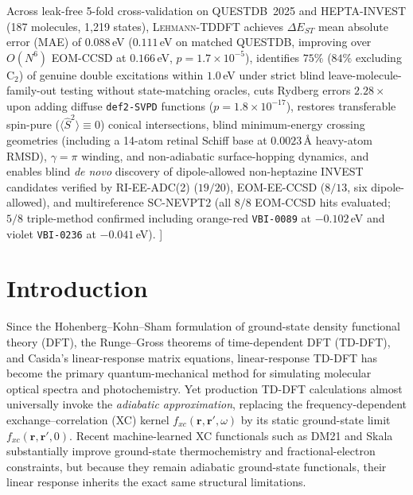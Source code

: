 \documentclass[10pt,twocolumn]{article}
\theoremstyle{natthm}
\newcommand{\leh}{\textsc{Lehmann-TDDFT}}
\newcommand{\dEST}{\Delta E_{ST}}
\newcommand{\Ssq}{\langle\hat{S}^2\rangle}
\begin{document}
{{{{      Across leak-free 5-fold cross-validation on QUESTDB~2025 and HEPTA-INVEST (187 molecules, 1,219 states), \leh{} achieves $\dEST$ mean absolute error (MAE) of $0.088$\,eV ($0.111$\,eV on matched QUESTDB, improving over $O(N^6)$ EOM-CCSD at $0.166$\,eV, $p=1.7\times 10^{-5}$), identifies $75\%$ ($84\%$ excluding $\mathrm{C}_2$) of genuine double excitations within $1.0$\,eV under strict blind leave-molecule-family-out testing without state-matching oracles, cuts Rydberg errors $2.28\times$ upon adding diffuse \texttt{def2-SVPD} functions ($p=1.8\times 10^{-17}$), restores transferable spin-pure ($\Ssq\equiv 0$) conical intersections, blind minimum-energy crossing geometries (including a 14-atom retinal Schiff base at $0.0023$\,\AA{} heavy-atom RMSD), $\gamma=\pi$ winding, and non-adiabatic surface-hopping dynamics, and enables blind \emph{de novo} discovery of dipole-allowed non-heptazine INVEST candidates verified by RI-EE-ADC(2) ($19/20$), EOM-EE-CCSD ($8/13$, six dipole-allowed), and multireference SC-NEVPT2 (all $8/8$ EOM-CCSD hits evaluated; $5/8$ triple-method confirmed including orange-red \texttt{VBI-0089} at $-0.102$\,eV and violet \texttt{VBI-0236} at $-0.041$\,eV).%
      }\vspace{3pt}%
    }%
  }
  \vspace{11pt}
}]

\section*{Introduction}
Since the Hohenberg--Kohn--Sham formulation of ground-state density functional theory (DFT)\cite{hohenberg1964,kohn1965}, the Runge--Gross theorems of time-dependent DFT (TD-DFT)\cite{runge1984}, and Casida's linear-response matrix equations\cite{casida1995,petersilka1996,hirata1999,furche2002}, linear-response TD-DFT has become the primary quantum-mechanical method for simulating molecular optical spectra and photochemistry\cite{dreuw2005,ullrich2012,casida2012,laurent2013,maitra2016}.
Yet production TD-DFT calculations almost universally invoke the \emph{adiabatic approximation}, replacing the frequency-dependent exchange--correlation (XC) kernel $f_{xc}(\mathbf{r},\mathbf{r}',\omega)$ by its static ground-state limit $f_{xc}(\mathbf{r},\mathbf{r}',0)$\cite{ullrich2012,maitra2016}.
Recent machine-learned XC functionals such as DM21\cite{kirkpatrick2021} and Skala\cite{luise2025skala} substantially improve ground-state thermochemistry and fractional-electron constraints, but because they remain adiabatic ground-state functionals, their linear response inherits the exact same structural limitations.
\end{document}
